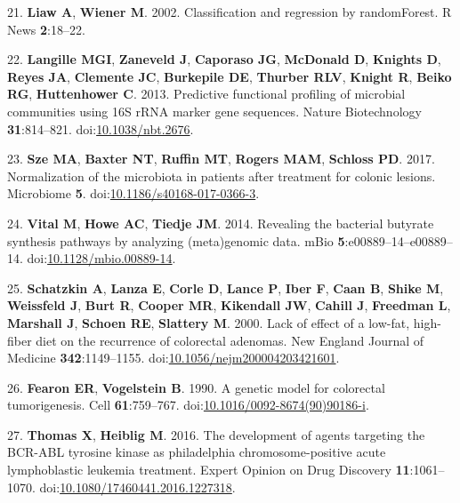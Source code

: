 \documentclass[11pt,]{article}
\begin{document}
\hypertarget{ref-randomforest_citation_2002}{}
21. \textbf{Liaw A}, \textbf{Wiener M}. 2002. Classification and
regression by randomForest. R News \textbf{2}:18--22.

\hypertarget{ref-Langille2013}{}
22. \textbf{Langille MGI}, \textbf{Zaneveld J}, \textbf{Caporaso JG},
\textbf{McDonald D}, \textbf{Knights D}, \textbf{Reyes JA},
\textbf{Clemente JC}, \textbf{Burkepile DE}, \textbf{Thurber RLV},
\textbf{Knight R}, \textbf{Beiko RG}, \textbf{Huttenhower C}. 2013.
Predictive functional profiling of microbial communities using 16S rRNA
marker gene sequences. Nature Biotechnology \textbf{31}:814--821.
doi:\href{https://doi.org/10.1038/nbt.2676}{10.1038/nbt.2676}.

\hypertarget{ref-normalization_Sze2017}{}
23. \textbf{Sze MA}, \textbf{Baxter NT}, \textbf{Ruffin MT},
\textbf{Rogers MAM}, \textbf{Schloss PD}. 2017. Normalization of the
microbiota in patients after treatment for colonic lesions. Microbiome
\textbf{5}.
doi:\href{https://doi.org/10.1186/s40168-017-0366-3}{10.1186/s40168-017-0366-3}.

\hypertarget{ref-Vital2014}{}
24. \textbf{Vital M}, \textbf{Howe AC}, \textbf{Tiedje JM}. 2014.
Revealing the bacterial butyrate synthesis pathways by analyzing
(meta)genomic data. mBio \textbf{5}:e00889--14--e00889--14.
doi:\href{https://doi.org/10.1128/mbio.00889-14}{10.1128/mbio.00889-14}.

\hypertarget{ref-Schatzkin2000}{}
25. \textbf{Schatzkin A}, \textbf{Lanza E}, \textbf{Corle D},
\textbf{Lance P}, \textbf{Iber F}, \textbf{Caan B}, \textbf{Shike M},
\textbf{Weissfeld J}, \textbf{Burt R}, \textbf{Cooper MR},
\textbf{Kikendall JW}, \textbf{Cahill J}, \textbf{Freedman L},
\textbf{Marshall J}, \textbf{Schoen RE}, \textbf{Slattery M}. 2000. Lack
of effect of a low-fat, high-fiber diet on the recurrence of colorectal
adenomas. New England Journal of Medicine \textbf{342}:1149--1155.
doi:\href{https://doi.org/10.1056/nejm200004203421601}{10.1056/nejm200004203421601}.

\hypertarget{ref-Fearon1990}{}
26. \textbf{Fearon ER}, \textbf{Vogelstein B}. 1990. A genetic model for
colorectal tumorigenesis. Cell \textbf{61}:759--767.
doi:\href{https://doi.org/10.1016/0092-8674(90)90186-i}{10.1016/0092-8674(90)90186-i}.

\hypertarget{ref-Thomas2016}{}
27. \textbf{Thomas X}, \textbf{Heiblig M}. 2016. The development of
agents targeting the BCR-ABL tyrosine kinase as philadelphia
chromosome-positive acute lymphoblastic leukemia treatment. Expert
Opinion on Drug Discovery \textbf{11}:1061--1070.
doi:\href{https://doi.org/10.1080/17460441.2016.1227318}{10.1080/17460441.2016.1227318}.
\end{document}
